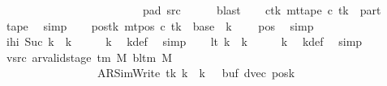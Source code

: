\begin{isabellebody}
\ \ \ \ \ \ \ \ \ \ \ \ \ \ \ \ \ \ \ \ \ \ \ \ \ pad{}\ src{}{\isacharbrackright}{\kern0pt}\isanewline
\ \ \ \ \isamarkupfalse%
\ blast\isanewline
\ \ \isamarkupfalse%
\ c{}tk{\isacharcolon}{\kern0pt}\ {\isachardoublequoteopen}mt{\isacharunderscore}{\kern0pt}tape\ c{}\ tk\ {\isacharequal}{\kern0pt}\ {\isacharquery}{\kern0pt}part{\isachardoublequoteclose}\ \isamarkupfalse%
\ tape{}\ \isamarkupfalse%
\ simp\isanewline
\ \ \isamarkupfalse%
\ pos{}{\isacharunderscore}{\kern0pt}tk{\isacharcolon}{\kern0pt}\ {\isachardoublequoteopen}mt{\isacharunderscore}{\kern0pt}pos\ c{}\ tk\ {\isacharequal}{\kern0pt}\ base\ {\isacharplus}{\kern0pt}\ {\isacharparenleft}{\kern0pt}{\isacharquery}{\kern0pt}k\ {\isacharminus}{\kern0pt}\ {}{\isacharparenright}{\kern0pt}{\isachardoublequoteclose}\ \isamarkupfalse%
\ pos{}\ \isamarkupfalse%
\ simp\isanewline
\ \ \isamarkupfalse%
\ ihi{\isacharcolon}{\kern0pt}\ {\isachardoublequoteopen}Suc\ {\isacharparenleft}{\kern0pt}{\isacharquery}{\kern0pt}k\ {\isacharplus}{\kern0pt}\ {\isacharparenleft}{\kern0pt}{\isacharquery}{\kern0pt}k\ {\isacharminus}{\kern0pt}\ {}{\isacharparenright}{\kern0pt}{\isacharparenright}{\kern0pt}\ {\isacharequal}{\kern0pt}\ {}\ {\isacharasterisk}{\kern0pt}\ {\isacharquery}{\kern0pt}k{\isachardoublequoteclose}\ \isamarkupfalse%
\ kdef\ \isamarkupfalse%
\ simp\isanewline
\ \ \isamarkupfalse%
\ lt{}{\isacharcolon}{\kern0pt}\ {\isachardoublequoteopen}{\isacharquery}{\kern0pt}k\ {\isacharplus}{\kern0pt}\ {\isacharparenleft}{\kern0pt}{\isacharquery}{\kern0pt}k\ {\isacharminus}{\kern0pt}\ {}{\isacharparenright}{\kern0pt}\ {\isacharless}{\kern0pt}\ {}\ {\isacharasterisk}{\kern0pt}\ {\isacharquery}{\kern0pt}k{\isachardoublequoteclose}\ \isamarkupfalse%
\ kdef\ \isamarkupfalse%
\ simp\isanewline
\ \ \isamarkupfalse%
\ vsrc{}{\isacharcolon}{\kern0pt}\ {\isachardoublequoteopen}ar{\isacharunderscore}{\kern0pt}valid{\isacharunderscore}{\kern0pt}stage\ {\isacharparenleft}{\kern0pt}{\isasymGamma}{\isacharunderscore}{\kern0pt}tm\ M{\isacharparenright}{\kern0pt}\ {\isacharparenleft}{\kern0pt}bl{\isacharunderscore}{\kern0pt}tm\ M{\isacharparenright}{\kern0pt}\isanewline
\ \ \ \ \ \ \ \ \ \ \ \ \ \ \ \ \ {\isacharparenleft}{\kern0pt}AR{\isacharunderscore}{\kern0pt}SimWrite{\isacharcomma}{\kern0pt}\ tk{\isacharcomma}{\kern0pt}\ {\isacharquery}{\kern0pt}k\ {\isacharplus}{\kern0pt}\ {\isacharparenleft}{\kern0pt}{\isacharquery}{\kern0pt}k\ {\isacharminus}{\kern0pt}\ {}{\isacharparenright}{\kern0pt}{\isacharcomma}{\kern0pt}\ buf{\isacharcomma}{\kern0pt}\ dvec{\isacharcomma}{\kern0pt}\ posk{\isacharparenright}{\kern0pt}{\isachardoublequoteclose}\isanewline

\end{isabellebody}
